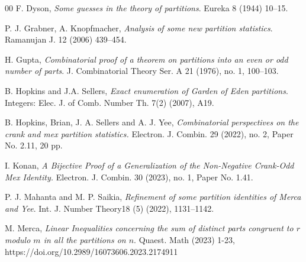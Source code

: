\documentclass{amsart}
\theoremstyle{definition}
\begin{document}
\begin{thebibliography}{00}
 F. Dyson, \textit{Some guesses in the theory of partitions}. Eureka 8 (1944) 10--15.

 P. J. Grabner, A. Knopfmacher, \textit{Analysis of some new partition statistics}. Ramanujan J. 12 (2006) 439--454.

H.  Gupta,
\textit{Combinatorial proof of a theorem on partitions into an even or odd number of parts}. J. Combinatorial Theory Ser. A 21 (1976), no. 1, 100--103.

  B. Hopkins and J.A. Sellers, \textit{Exact enumeration of Garden of Eden partitions}. Integers: Elec. J. of Comb. Number Th. 7(2) (2007), A19.

 B. Hopkins, Brian, J. A.  Sellers and A. J.  Yee, \textit{Combinatorial perspectives on the crank and mex partition statistics.} 
Electron. J. Combin. 29 (2022), no. 2, Paper No. 2.11, 20 pp. 

 I. 
Konan,
\textit{A Bijective Proof of a Generalization of the Non-Negative Crank-Odd Mex Identity.}
Electron. J. Combin. 30 (2023), no. 1, Paper No. 1.41. 

 P. J. Mahanta and M. P. Saikia, \textit{Refinement of some partition identities of Merca and Yee}. Int. J. Number Theory18 (5) (2022), 1131--1142.


 M. Merca, \textit{Linear Inequalities concerning the sum of distinct parts congruent to $r$ modulo $m$ in all the partitions on $n$}. Quaest. Math (2023) 1-23, \\ https://doi.org/10.2989/16073606.2023.2174911

\end{thebibliography}
\end{document}
